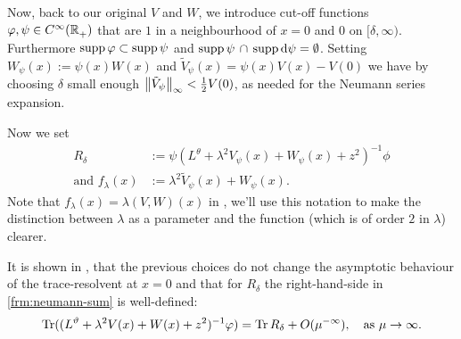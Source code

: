 Now, back to our original $V$ and $W$, we introduce cut-off functions $\varphi,
\psi\in C^\infty_{}({\mathbb{R}_+^{}})$ that are $1$ in a neighbourhood of $x = 0$ and $0$ on
$[\delta,\infty)$. Furthermore $\operatorname{supp}\varphi\subset\operatorname{supp}\psi$ and
$\operatorname{supp}\psi\,\cap\,\operatorname{supp}\mathrm d\psi = \emptyset$. Setting $W_\psi(x) :=
\psi(x)W(x)$ and $\tilde V_\psi(x) = \psi(x)V(x) - V(0)$ we have by choosing
$\delta$ small enough $\bigl\|\tilde V_\psi\bigr\|_{\infty} < \frac12V(0)$, as needed for the
Neumann series expansion.

Now we set
\begin{align}
  \label{frm:r-delta}
  R_\delta &:= \psi(L^\theta + \lambda^2V_\psi(x) + W_\psi(x) + z^2)^{-1}\phi \\
  \label{frm:f-lambda}
  \text{and } f_\lambda(x) &:= \lambda^2\tilde V_\psi(x) + W_\psi(x).
\end{align}
Note that $f_\lambda(x) = \lambda(V,W)(x)$ in \cite{LV13}, we'll use this
notation to make the distinction between $\lambda$ as a parameter and the
function (which is of order $2$ in $\lambda$) clearer.

It is shown in \cite[Sec. 2]{LV13}, that the previous choices do not change the
asymptotic behaviour of the trace-resolvent at $x=0$ and that for $R_\delta$ the
right-hand-side in \eqref{frm:neumann-sum} is well-defined:
\begin{align*}
  \operatorname{Tr}((L^\vartheta + \lambda^2 V(x) + W(x) + z^2)^{-1}\varphi) =
  \operatorname{Tr} R_\delta + O(\mu^{-\infty}), \quad \text{as } \mu\to\infty.
\end{align*}

